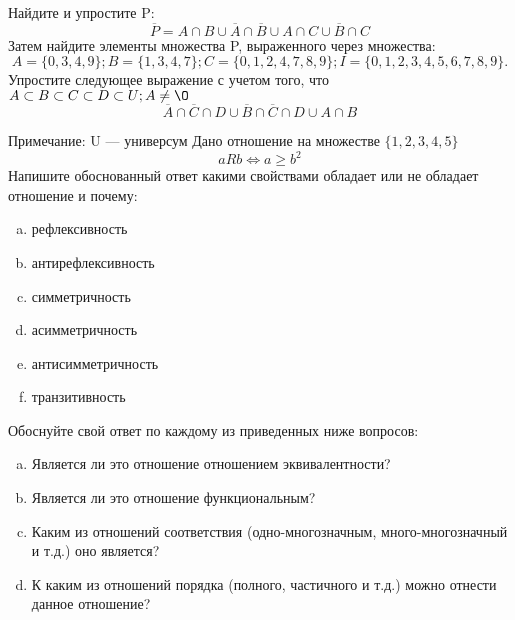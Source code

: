 \documentclass[10pt]{exam}
\begin{document}
\begin{questions}
\question
Найдите и упростите P:
\begin{equation*}
\overline{P} = A \cap B \cup \overline{A} \cap \overline{B} \cup A \cap C \cup \overline{B} \cap C
\end{equation*}
Затем найдите элементы множества P, выраженного через множества:
\begin{equation*}
A = \{0, 3, 4, 9\}; 
B = \{1, 3, 4, 7\};
C = \{0, 1, 2, 4, 7, 8, 9\};
I = \{0, 1, 2, 3, 4, 5, 6, 7, 8, 9\}.
\end{equation*}\question
Упростите следующее выражение с учетом того, что $A\subset B \subset C \subset D \subset U; A \neq \O$
\begin{equation*}
\overline{A} \cap \overline{C} \cap D \cup \overline{B} \cap \overline{C} \cap D \cup A \cap B
\end{equation*}

Примечание: U — универсум\question
Дано отношение на множестве $\{1, 2, 3, 4, 5\}$ 
\begin{equation*}
aRb \iff a \geq b^2
\end{equation*}
Напишите обоснованный ответ какими свойствами обладает или не обладает отношение и почему:   
\begin{enumerate} [a)]\setcounter{enumi}{0}
\item рефлексивность
\item антирефлексивность
\item симметричность
\item асимметричность
\item антисимметричность
\item транзитивность
\end{enumerate}

Обоснуйте свой ответ по каждому из приведенных ниже вопросов:
\begin{enumerate} [a)]\setcounter{enumi}{0}
    \item Является ли это отношение отношением эквивалентности?
    \item Является ли это отношение функциональным?
    \item Каким из отношений соответствия (одно-многозначным, много-многозначный и т.д.) оно является?
    \item К каким из отношений порядка (полного, частичного и т.д.) можно отнести данное отношение?
\end{enumerate}



\end{questions}
\end{document}
